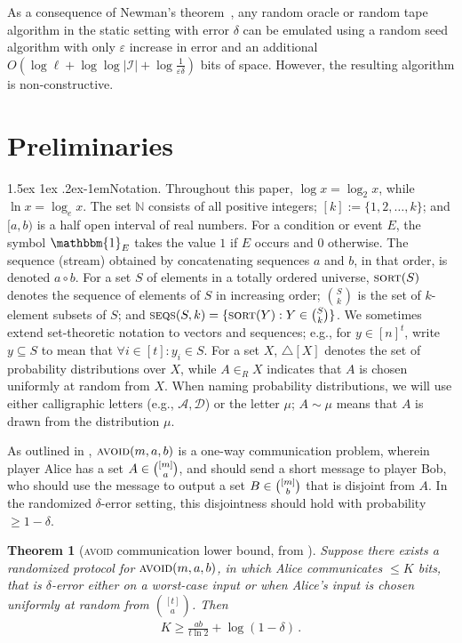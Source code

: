 \documentclass[10pt,a4paper]{article}
\makeatletter
\newtheorem{theorem}{Theorem}[section]
\theoremstyle{definition}
\theoremstyle{remark}
\newcommand\squeezepar{\@startsection{paragraph}{4}%
{\z@}{1.5ex \@plus1ex \@minus.2ex}{-1em}{\normalfont\normalsize\bfseries}}
\newcommand{\mypara}[1]{\squeezepar{{#1}.}}
\newcommand{\NN}{\mathbb{N}}
\newcommand{\indic}{\mathbbm{1}}
\newcommand{\cA}{\mathcal{A}}
\newcommand{\cD}{\mathcal{D}}
\newcommand{\cI}{\mathcal{I}}
\let\epsilon\varepsilon
\newcommand{\avoid}{\textsc{avoid}\xspace}
\newcommand{\sort}{\textsc{sort}\xspace}
\newcommand{\rl}{\mathbf{\ell}}             %
\newcommand{\concat}{\mathbin{\circ}}       %
\newcommand{\SSD}[2]{\textsc{seqs}(#1,#2)}  %
\makeatother
\begin{document}
\begin{itemize}
\begin{itemize}
As a consequence of Newman's theorem~\cite{Newman91}, any random oracle or
random tape algorithm in the static setting with error $\delta$ can be
emulated using a random seed algorithm with only $\epsilon$ increase in error
and an additional $O(\log \rl + \log \log |\cI| + \log \frac{1}{\epsilon
\delta})$ bits of space. However, the resulting algorithm is non-constructive.


\section{Preliminaries}\label{sec:prelim}

\mypara{Notation} Throughout this paper, $\log x = \log_2 x$, while $\ln x =
\log_e x$. The set $\NN$ consists of all positive integers; $[k] :=
\{1,2,\ldots,k\}$; and $[a,b)$ is a half open interval of real numbers. For a
condition or event $E$, the symbol $\indic_{E}$ takes the value $1$ if $E$
occurs and $0$ otherwise. The sequence (stream) obtained by concatenating
sequences $a$ and $b$, in that order, is denoted $a \concat b$. For a set $S$
of elements in a totally ordered universe, $\sort(S)$ denotes the sequence of
elements of $S$ in increasing order; $\binom{S}{k}$ is the set of $k$-element
subsets of $S$; and $\SSD{S}{k} = \{\sort(Y) : Y \in \binom{S}{k}\}$. We
sometimes extend set-theoretic notation to vectors and sequences; e.g., for $y
\in [n]^t$, write $y \subseteq S$ to mean that $\forall i \in [t]: y_i \in S$.
For a set $X$, $\triangle[X]$ denotes the set of probability distributions
over $X$, while $A \in_R X$ indicates that $A$ is chosen uniformly at random
from $X$. When naming probability distributions, we will use either
calligraphic letters (e.g., $\cA,\cD$) or the letter $\mu$; $A \sim \mu$ means
that $A$ is drawn from the distribution $\mu$.

As outlined in , $\avoid(m,a,b)$ is a one-way
communication problem, wherein player Alice has a set $A \in
\smash{\binom{[m]}{a}}$, and should send a short message to player Bob, who
should use the message to output a set $B \in \smash{\binom{[m]}{b}}$ that is
disjoint from $A$. In the randomized $\delta$-error setting, this disjointness
should hold with probability $\ge 1-\delta$.

\begin{theorem}[\avoid communication lower bound, from \cite{ChakrabartiGS22}]\label{lem:avoid-lb}
  Suppose there exists a randomized protocol for $\avoid(m,a,b)$, in which
  Alice communicates $\le K$ bits, that is $\delta$-error either on a
  worst-case input or when Alice's input is chosen uniformly at random from
  $\binom{[t]}{a}$. Then
  \begin{align*}
    K \ge \frac{a b}{t \ln 2} + \log(1-\delta) \,.
  \end{align*}
\end{theorem}


\end{itemize}
\end{itemize}
\end{document}
